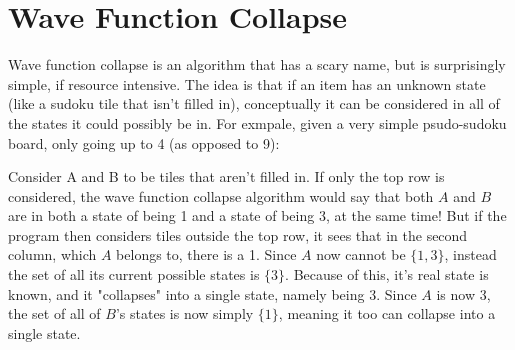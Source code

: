 \documentclass[11pt]{article}
\begin{document}
\section{Wave Function Collapse}
Wave function collapse is an algorithm that has a scary name, but 
is surprisingly simple, if resource intensive. The idea is that if 
an item has an unknown state (like a sudoku tile that isn't filled in), 
conceptually it can be considered in all of the states it could possibly be in.
For exmpale, given a very simple psudo-sudoku board, only going up to 4 (as opposed to 9):\\
\begin{center}
\end{center}
Consider A and B to be tiles that aren't filled in. If only the top row is considered, the wave
function collapse algorithm would say that both $A$ and $B$ are in both a state of being 1 
and a state of being 3, at the same time! But if the program then considers tiles outside the top row,
it sees that in the second column, which $A$ belongs to, there is a 1. Since $A$ now cannot be $\{1, 3\}$, 
instead the set of all its current possible states is $\{3\}$. Because of this, it's real state is known, and it 
"collapses" into a single state, namely being 3. Since $A$ is now 3, the set of all of $B$'s states is now simply
$\{1\}$, meaning it too can collapse into a single state. \\
\end{document}
